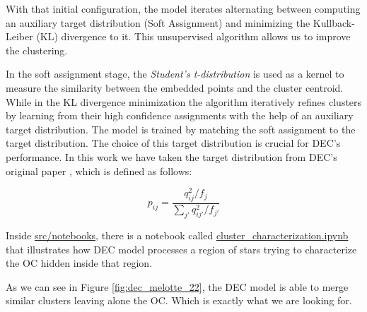 \documentclass[11pt, a4paper, english]{book}
\begin{document}
With that initial configuration, the model iterates alternating between computing an auxiliary target distribution (Soft Assignment)
and minimizing the Kullback-Leiber (KL) divergence \cite{kullback1951information} to it. This unsupervised algorithm allows us to improve
the clustering.

In the soft assignment stage, the \emph{Student's t-distribution} is used as a kernel to measure the similarity between the embedded points
and the cluster centroid. While in the KL divergence minimization the algorithm iteratively refines clusters by learning from their high
confidence assignments with the help of an auxiliary target distribution. The model is trained by matching the soft assignment to the target
distribution. The choice of this target distribution is crucial for DEC's performance. In this work we have taken the target distribution
from DEC's original paper \cite{xie2016unsupervised}, which is defined as follows:

\begin{equation}
  p_{ij} = \frac{q^{2}_{ij} / f_{j}}{\sum_{j'}q^{2}_{ij'}/f_{j'}}
\end{equation}

Inside \href{https://github.com/cdalvaro/machine-learning-master-thesis/blob/main/src/notebooks}{src/notebooks},
there is a notebook called
\href{https://github.com/cdalvaro/machine-learning-master-thesis/blob/main/src/notebooks/cluster_characterization.ipynb}{cluster\_characterization.ipynb}
that illustrates how DEC model processes a region of stars trying to characterize the OC hidden inside that region.

As we can see in Figure \ref{fig:dec_melotte_22}, the DEC model is able to merge similar clusters leaving alone the OC. Which is exactly what we are looking for.
\end{document}
